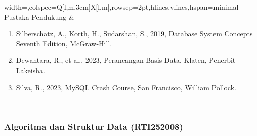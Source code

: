 \begin{longtblr}{width=\textwidth,colspec={Q[l,m,3cm]X[l,m]},rowsep=2pt,hlines,vlines,hspan=minimal}
Pustaka Pendukung & \begin{enumerate}\item Silberschatz, A., Korth, H., Sudarshan, S., 2019, Database System Concepts Seventh Edition, McGraw-Hill.\item Dewantara, R., et al., 2023, Perancangan Basis Data, Klaten, Penerbit Lakeisha.\item Silva, R., 2023, MySQL Crash Course, San Francisco, William Pollock.\end{enumerate} \\
\end{longtblr}

\subsubsection*{Algoritma dan Struktur Data (RTI252008)}

